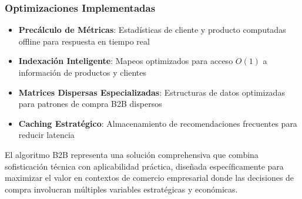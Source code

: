 \documentclass[twocolumn]{article}
\begin{document}
\subsubsection{Optimizaciones Implementadas}

\begin{itemize}
    \item \textbf{Precálculo de Métricas}: Estadísticas de cliente y producto computadas offline para respuesta en tiempo real
    \item \textbf{Indexación Inteligente}: Mapeos optimizados para acceso \(O(1)\) a información de productos y clientes
    \item \textbf{Matrices Dispersas Especializadas}: Estructuras de datos optimizadas para patrones de compra B2B dispersos
    \item \textbf{Caching Estratégico}: Almacenamiento de recomendaciones frecuentes para reducir latencia
\end{itemize}

El algoritmo B2B representa una solución comprehensiva que combina sofisticación técnica con aplicabilidad práctica, diseñada específicamente para maximizar el valor en contextos de comercio empresarial donde las decisiones de compra involucran múltiples variables estratégicas y económicas.
\end{document}
